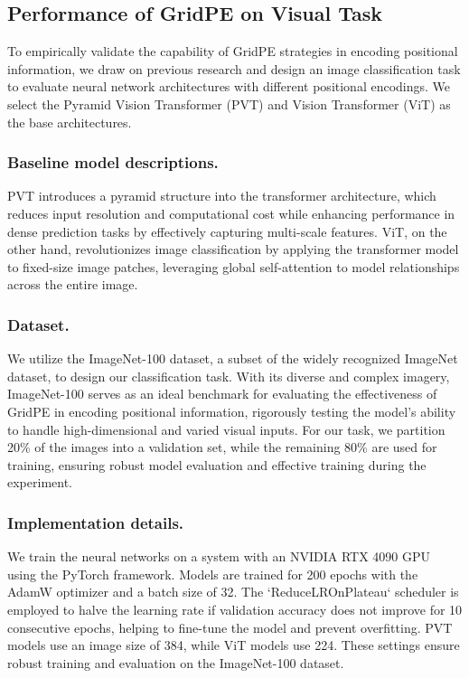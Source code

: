 \documentclass[letterpaper]{article} %
\begin{document}
\subsection{Performance of GridPE on Visual Task}

To empirically validate the capability of GridPE strategies in encoding positional information, we draw on previous research \cite{chu2021Twins, chu2023CPVT} and design an image classification task to evaluate neural network architectures with different positional encodings. We select the Pyramid Vision Transformer (PVT) \cite{wang2021pyramid} and Vision Transformer (ViT) \cite{dosovitskiy2020image} as the base architectures.

\subsubsection*{Baseline model descriptions.} 
PVT introduces a pyramid structure into the transformer architecture, which reduces input resolution and computational cost while enhancing performance in dense prediction tasks by effectively capturing multi-scale features. ViT, on the other hand, revolutionizes image classification by applying the transformer model to fixed-size image patches, leveraging global self-attention to model relationships across the entire image. 

\subsubsection*{Dataset.} 
We utilize the ImageNet-100 dataset, a subset of the widely recognized ImageNet dataset, to design our classification task. With its diverse and complex imagery, ImageNet-100 serves as an ideal benchmark for evaluating the effectiveness of GridPE in encoding positional information, rigorously testing the model's ability to handle high-dimensional and varied visual inputs. For our task, we partition 20\% of the images into a validation set, while the remaining 80\% are used for training, ensuring robust model evaluation and effective training during the experiment.

\subsubsection*{Implementation details.} 
We train the neural networks on a system with an NVIDIA RTX 4090 GPU using the PyTorch framework. Models are trained for 200 epochs with the AdamW optimizer and a batch size of 32. The `ReduceLROnPlateau` scheduler is employed to halve the learning rate if validation accuracy does not improve for 10 consecutive epochs, helping to fine-tune the model and prevent overfitting. PVT models use an image size of 384, while ViT models use 224. These settings ensure robust training and evaluation on the ImageNet-100 dataset.
\end{document}
